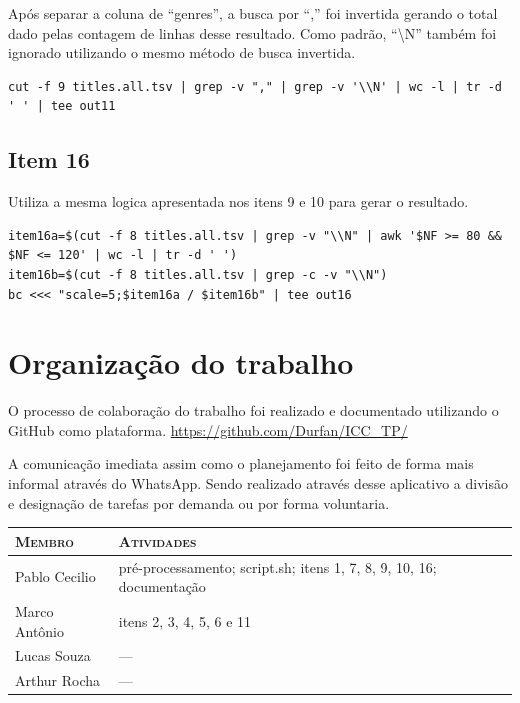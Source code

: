 \documentclass[12pt]{article}
\begin{document}
Após separar a coluna de ``genres'', a busca por  ``,''  foi invertida gerando o total dado pelas contagem de linhas desse resultado. Como padrão, ``\textbackslash N'' também foi ignorado utilizando o mesmo método de busca invertida.

\begin{verbatim}
cut -f 9 titles.all.tsv | grep -v "," | grep -v '\\N' | wc -l | tr -d ' ' | tee out11
\end{verbatim}

\subsection*{Item 16}

Utiliza a mesma logica apresentada nos itens 9 e 10 para gerar o resultado.

\begin{verbatim}
item16a=$(cut -f 8 titles.all.tsv | grep -v "\\N" | awk '$NF >= 80 && $NF <= 120' | wc -l | tr -d ' ')
item16b=$(cut -f 8 titles.all.tsv | grep -c -v "\\N")
bc <<< "scale=5;$item16a / $item16b" | tee out16
\end{verbatim}

\section{Organização do trabalho}

O processo de colaboração do trabalho foi realizado e documentado utilizando o GitHub como plataforma. \url{https://github.com/Durfan/ICC_TP/}

A comunicação imediata assim como o planejamento foi feito de forma mais informal através do WhatsApp. Sendo realizado através desse aplicativo a divisão e designação de tarefas por demanda ou por forma voluntaria.

\begin{table}[!h]
    \begin{tabular}{p{5cm}p{7.5cm}}
    
        \textsc{Membro}      & \textsc{Atividades} \\ 
	    \hline
        Pablo Cecilio & pré-processamento; script.sh; itens 1, 7, 8, 9, 10, 16; documentação \\ 
        Marco Antônio & itens 2, 3, 4, 5, 6 e 11 \\
        Lucas Souza & --- \\
        Arthur Rocha & --- \\

    \end{tabular}
\end{table}
\end{document}
